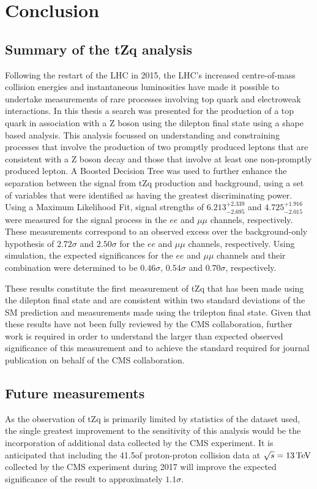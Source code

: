 \chapter{Conclusion}\label{chapter:conclusion}
\section{Summary of the tZq analysis}
Following the restart of the LHC in 2015, the LHC's increased centre-of-mass collision energies and instantaneous luminosities have made it possible to undertake measurements of rare processes involving top quark and electroweak interactions.
In this thesis a search was presented for the production of a top quark in association with a Z boson using the dilepton final state using a shape based analysis.
This analysis focussed on understanding and constraining processes that involve the production of two promptly produced leptons that are consistent with a Z boson decay and those that involve at least one non-promptly produced lepton.
A Boosted Decision Tree was used to further enhance the separation between the signal from tZq production and background, using a set of variables that were identified as having the greatest discriminating power.
Using a Maximum Likelihood Fit, signal strengths of $6.213_{-2.695}^{+2.339}$ and $4.725_{-2.015}^{+1.916}$ were measured for the signal process in the $ee$ and $\mu\mu$ channels, respectively.
These measurements correspond to an observed excess over the background-only hypothesis of $2.72\sigma$ and $2.50\sigma$ for the $ee$ and $\mu\mu$ channels, respectively.
Using simulation, the expected significances for the $ee$ and $\mu\mu$ channels and their combination were determined to be $0.46\sigma$, $0.54\sigma$ and $0.70\sigma$, respectively.

These results constitute the first measurement of tZq that has been made using the dilepton final state and are consistent within two standard deviations of the SM prediction and measurements made using the trilepton final state.
Given that these results have not been fully reviewed by the CMS collaboration, further work is required in order to understand the larger than expected observed significance of this measurement and to achieve the standard required for journal publication on behalf of the CMS collaboration.

\section{Future measurements}
As the observation of tZq is primarily limited by statistics of the dataset used, the single greatest improvement to the sensitivity of this analysis would be the incorporation of additional data collected by the CMS experiment.
It is anticipated that including the 41.5\fbinv of proton-proton collision data at $\sqrt{s} = 13\,\text{Te\hspace{-.08em}V}$ collected by the CMS experiment during 2017 will improve the expected significance of the result to approximately $1.1\sigma$.


